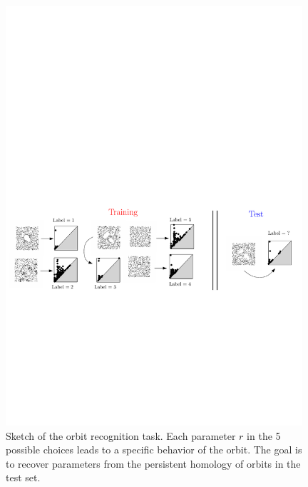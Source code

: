 \begin{figure}[t] 
\centering
\includegraphics[width=0.98\textwidth]{figures/ltm/taskltm}
\caption[Orbit recognition]{\label{fig:taskltm} Sketch of the orbit recognition task. Each parameter $r$ in the 5 possible choices
leads to a specific behavior of the orbit. 
The goal is to recover parameters from the persistent homology of orbits in the test set.}
\end{figure}

